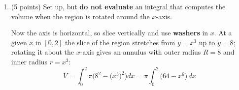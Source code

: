 \documentclass[12pt]{article}
\renewcommand{\emph}[1]{\textsf{\textbf{#1}}}
\begin{document}
\begin{enumerate}
\begin{enumerate}
\begin{solution}
    \end{solution}

  \newpage

  \item (5 points) Set up, but {\bf do not evaluate} an integral that computes
    the volume when the region is rotated around the $x$-axis.

    \begin{solution}
      Now the axis is horizontal, so slice vertically and use \emph{washers} in
      $x$.  At a given $x$ in $[0,2]$ the slice of the region stretches from
      $y=x^3$ up to $y=8$; rotating it about the $x$-axis gives an annulus with
      outer radius $R=8$ and inner radius $r=x^3$:
      \[
        \boxed{\;V=\int_0^2 \pi\Big(8^2-\big(x^3\big)^2\Big)dx
              =\pi\int_0^2\big(64-x^6\big)\,dx\;}
      \]
    \end{solution}
  \end{enumerate}

\end{enumerate}
\end{document}
